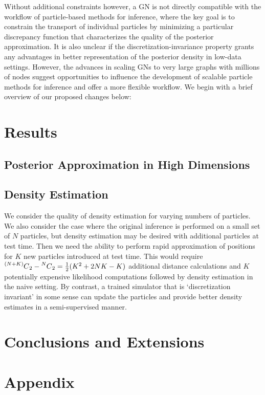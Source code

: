 \documentclass[12pt]{article}
\newcommand\Mycomb[2][^n]{\prescript{#1\mkern-0.5mu}{}C_{#2}}
\renewcommand{\[}{\left[}
\renewcommand{\]}{\right]}
\renewcommand{\(}{\left(}
\renewcommand{\)}{\right)}
\begin{document}
Without additional constraints however, a GN is not directly compatible with the workflow of particle-based methods for inference, where the key goal is to constrain the transport of individual particles by minimizing a particular discrepancy function that characterizes the quality of the posterior approximation. 
It is also unclear if the discretization-invariance property grants any advantages in better representation of the posterior density in low-data settings. 
However, the advances in scaling GNs to very large graphs with millions of nodes suggest opportunities to influence the development of scalable particle methods for inference and offer a more flexible workflow. 
We begin with a brief overview of our proposed changes below:



\section{Results}

\subsection{Posterior Approximation in High Dimensions}


\subsection{Density Estimation}
We consider the quality of density estimation for varying numbers of particles. 
We also consider the case where the original inference is performed on a small set of $N$ particles, but density estimation may be desired with additional particles at test time. 
Then we need the ability to perform rapid approximation of positions for $K$ new particles introduced at test time. 
This would require $\Mycomb[(N+K)]{2} - \Mycomb[N]{2} = \frac{1}{2}(K^2 + 2NK - K)$ additional distance calculations and $K$ potentially expensive likelihood computations followed by density estimation in the naive setting. 
By contrast, a trained simulator that is `discretization invariant' in some sense can update the particles and provide better density estimates in a semi-supervised manner.

\subsection{}

\section{Conclusions and Extensions}






\section*{Appendix}
\end{document}
